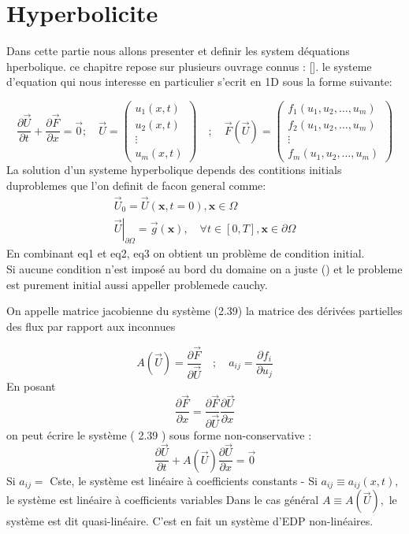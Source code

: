 \section {Hyperbolicite}

Dans cette partie nous allons presenter et definir les system déquations hperbolique.
ce chapitre repose sur plusieurs ouvrage connus : []. le systeme d'equation qui nous interesse en particulier s'ecrit en 1D sous la forme suivante:

\begin{equation}
\frac{\partial \vec{U}}{\partial t}+\frac{\partial \vec{F}}{\partial x}=\overrightarrow{0}; \quad \vec{U}=\left( \begin{array}{l}
u_{1}(x, t) \\
u_{2}(x, t) \\
\vdots \\
u_{m}(x, t)
\end{array}\right) \quad ; \quad \vec{F}(\vec{U})=\left( \begin{array}{l}
f_{1}\left(u_{1}, u_{2}, \ldots, u_{m}\right) \\
f_{2}\left(u_{1}, u_{2}, \ldots, u_{m}\right) \\
\vdots \\
f_{m}\left(u_{1}, u_{2}, \ldots, u_{m}\right)
\end{array}\right)
\end{equation}
La solution d'un systeme hyperbolique depends des contitions initials duproblemes que l'on definit de facon general comme:
\begin{equation}
\begin{array}{r}
\vec{U}_{0}=\vec{U}(\mathbf{x}, t=0), \mathbf{x} \in \Omega \\
\left.\vec{U}\right|_{\partial \Omega}=\vec{g}(\mathbf{x}), \quad \forall t \in[0, T], \mathbf{x} \in \partial \Omega
\end{array}
\end{equation}
En combinant eq1 et eq2, eq3 on obtient un problème de condition initial.\\
Si aucune condition n'est imposé au bord du domaine on a juste () et le probleme est purement initial aussi appeller problemede cauchy.

On appelle matrice jacobienne du système (2.39) la matrice des dérivées partielles des flux par rapport aux inconnues

$$
A(\vec{U})=\frac{\partial \vec{F}}{\partial \vec{U}} \quad ; \quad a_{i j}=\frac{\partial f_{i}}{\partial u_{j}}
$$
En posant
$$
\frac{\partial \vec{F}}{\partial x}=\frac{\partial \vec{F}}{\partial \vec{U}} \frac{\partial \vec{U}}{\partial x}
$$
on peut écrire le système ( 2.39 ) sous forme non-conservative :
$$
\frac{\partial \vec{U}}{\partial t}+A(\vec{U}) \frac{\partial \vec{U}}{\partial x}=\overrightarrow{0}
$$
Si $a_{i j}=$ Cste, le système est linéaire à coefficients constants
- Si $a_{i j} \equiv a_{i j}(x, t),$ le système est linéaire à coefficients variables Dans le cas général $A \equiv A(\vec{U}),$ le système est dit quasi-linéaire. C'est en fait un système d'EDP non-linéaires.

